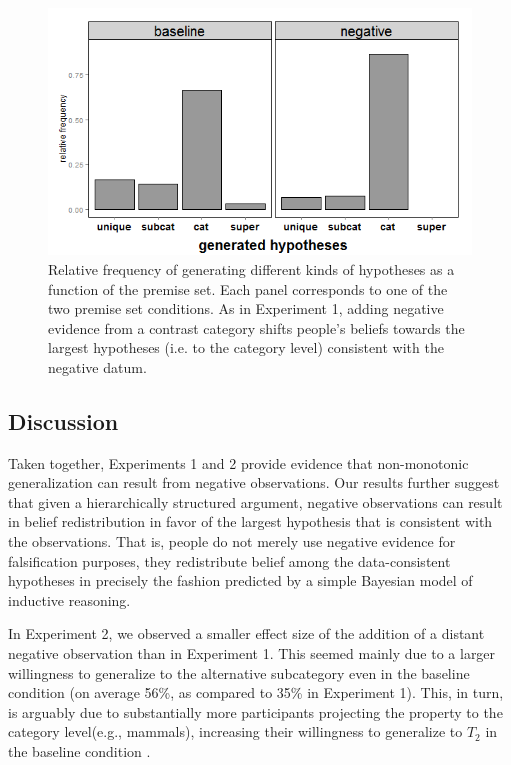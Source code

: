 \documentclass[authoryear,11pt]{elsarticle}
\begin{document}
\begin{figure}[t]
\begin{center}
\includegraphics[trim=0cm 0cm 0cm 0cm, clip=true, scale=.45]{fig/Exp2_hgen.png}
\end{center}
\vspace{-7mm}
\caption{\small Relative frequency of generating different kinds of hypotheses as a function of the premise set. Each panel corresponds to one of the two premise set conditions. As in Experiment 1, adding negative evidence from a contrast category shifts people's beliefs towards the largest hypotheses (i.e. to the {\sc category} level) consistent with the negative datum.\normalsize}
\label{fig:Exp2_Hgen}
\end{figure}

\subsection{Discussion}

Taken together, Experiments 1 and 2 provide evidence that non-monotonic generalization can result from negative observations. Our results further suggest that given a hierarchically structured argument, negative observations can result in belief redistribution in favor of the largest hypothesis that is consistent with the observations. That is, people do not merely use negative evidence for falsification purposes, they redistribute belief among the data-consistent hypotheses in precisely the fashion predicted by a simple Bayesian model of inductive reasoning.

In Experiment 2, we observed a smaller effect size of the addition of a distant negative observation than in Experiment 1. This seemed mainly due to a larger willingness to generalize to the alternative subcategory even in the {\sc baseline} condition (on average 56\%, as compared to 35\% in Experiment 1). This, in turn,  is arguably due to substantially more participants projecting the property to the category level(e.g., mammals), increasing their willingness to generalize to $T_2$ in the {\sc baseline} condition  .
\end{document}
